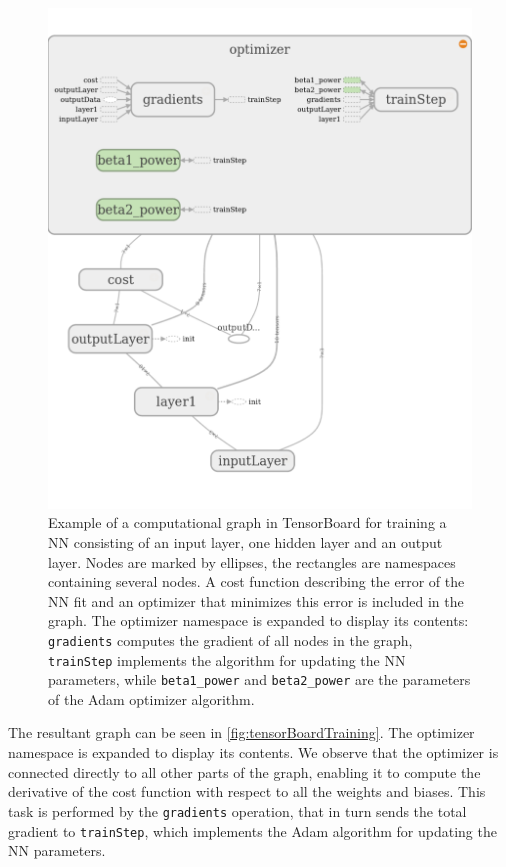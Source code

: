 \documentclass[twoside,english]{uiofysmaster}
\begin{document}
\begin{figure}[H]
\centering
  \includegraphics[width=\linewidth]{Figures/Implementation/tensorBoardTraining.pdf}
  \caption{Example of a computational graph in TensorBoard for training a NN consisting of an input layer, one 
	   hidden layer and an output layer. Nodes are marked by ellipses, the rectangles are namespaces
	   containing several nodes. A cost function describing the error of the NN fit and an optimizer that minimizes
	   this error is included in the graph. The optimizer namespace is expanded to display its contents:
	   \texttt{gradients} computes the gradient of all nodes in the graph, \texttt{trainStep} implements
	   the algorithm for updating the NN parameters, while \texttt{beta1\_power} and \texttt{beta2\_power}
	   are the parameters of the Adam optimizer algorithm.}
  \label{fig:tensorBoardTraining}
\end{figure}
The resultant graph can be seen in \autoref{fig:tensorBoardTraining}. 
The optimizer namespace is expanded to display its contents. 
We observe that the optimizer is connected directly to all other parts of the graph, enabling it
to compute the derivative of the cost function with respect to all the weights and biases. This task is
performed by the \texttt{gradients} operation, that in turn sends the total gradient to \texttt{trainStep}, 
which implements the Adam algorithm for updating the NN parameters. 
\end{document}
